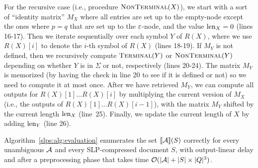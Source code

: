 For the recursive case (i.e., procedure $\textproc{NonTerminal}(X)$), we start with a sort of ``identity matrix'' $M_X$ where all entries are set up to the empty-node except the ones where $p = q$ that are set up to the $\varepsilon$-node, and the value $\operatorname{len}_X = 0$ (lines 16-17). Then we iterate sequentially over each symbol $Y$ of $R(X)$, where we use $R(X)[i]$ to denote the $i$-th symbol of $R(X)$ (lines 18-19). If $M_Y$ is not defined, then we recursively compute $\textproc{Terminal}(Y)$ or $\textproc{NonTerminal}(Y)$ depending on whether $Y$ is in $\Sigma$ or not, respectively (lines 20-24). The matrix $M_Y$ is memorized (by having the check in line 20 to see if it is defined or not) so we need to compute it at most once.
After we have retrieved $M_Y$, we can compute all outputs for $R(X)[1] \ldots R(X)[i]$ by multiplying the current version of $M_X$ (i.e., the outputs of $R(X)[1] \ldots R(X)[i-1]$), with the matrix $M_Y$ shifted by the current length $\operatorname{len}_X$ (line~25).  Finally, we update the current length of $X$ by adding $\operatorname{len}_Y$ (line 26). 
\begin{theorem}\label{slps:theo:evaluation}
	Algorithm~\ref{slps:alg:evaluation} enumerates the set ${\llbracket{\mathcal{A}}\rrbracket}(S)$ correctly for every unambiguous \rt $\mathcal{A}$ and every SLP-compressed document $S$, with output-linear delay and after a preprocessing phase that takes time $\mathcal{O}(|\mathcal{A}| + |S|\times|Q|^3)$.
\end{theorem}
